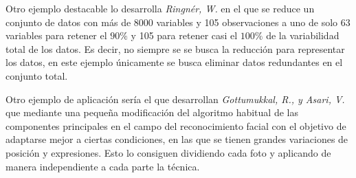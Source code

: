 \noindent Otro ejemplo destacable lo desarrolla \emph{Ringnér, W.}\cite{Ringnér 2008} en el que se reduce un conjunto de datos con más de 8000 variables y 105 observaciones a uno de solo 63 variables para retener el $90\%$ y 105 para retener casi el $100\%$ de la variabilidad total de los datos. Es decir, no siempre se se busca la reducción para representar los datos, en este ejemplo únicamente se busca eliminar datos redundantes en el conjunto total. 

\noindent Otro ejemplo de aplicación sería el que desarrollan \emph{Gottumukkal, R., y Asari, V.} \cite {Asari 2004} que mediante una pequeña modificación del algoritmo habitual de las componentes principales en el campo del reconocimiento facial con el objetivo de adaptarse mejor a ciertas condiciones, en las que se tienen grandes variaciones de posición y expresiones. Esto lo consiguen dividiendo cada foto y aplicando de manera independiente a cada parte la técnica. 

